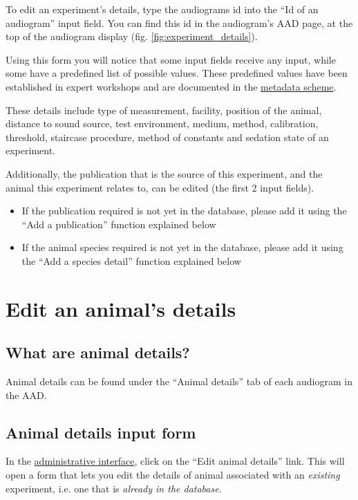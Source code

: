 \documentclass{article}
\begin{document}
To edit an experiment's details, type the audiograms id into the ``Id of an audiogram'' input field. You can find this id in the audiogram's AAD page, at the top of the audiogram display (fig. \ref{fig:experiment_details}).

Using this form you will notice that some input fields receive any input, while some have a predefined list of possible values. These predefined values have been established in expert workshops and are documented in the \href{https://github.com/MfN-Berlin/AnimalAudiogramDatabase/blob/main/resources/metadata/audiogram_metadata_scheme.md}{metadata scheme}.

These details include type of measurement, facility, position of the animal, distance to sound source, test environment, medium, method, calibration, threshold, staircase procedure, method of constants and sedation state of an experiment. 

Additionally, the publication that is the source of this experiment, and the animal this experiment relates to, can be edited (the first 2 input fields).
\begin{itemize}
\item{If the publication required is not yet in the database, please add it using the ``Add a publication'' function explained below}
\item{If the animal species required is not yet in the database, please add it using the ``Add a species detail'' function explained below}
\end{itemize}


\section{Edit an animal's details}
\subsection{What are animal details?}
Animal details can be found under the ``Animal details'' tab of each audiogram in the AAD.

\subsection{Animal details input form}
In the \href{https://animalaudiograms.museumfuernaturkunde.berlin/admin/v1/start}{administrative interface}, click on the ``Edit animal details'' link. This will open a form that lets you edit the details of animal associated with an \emph{existing} experiment, i.e. one that is \emph{already in the database}.
\end{document}
